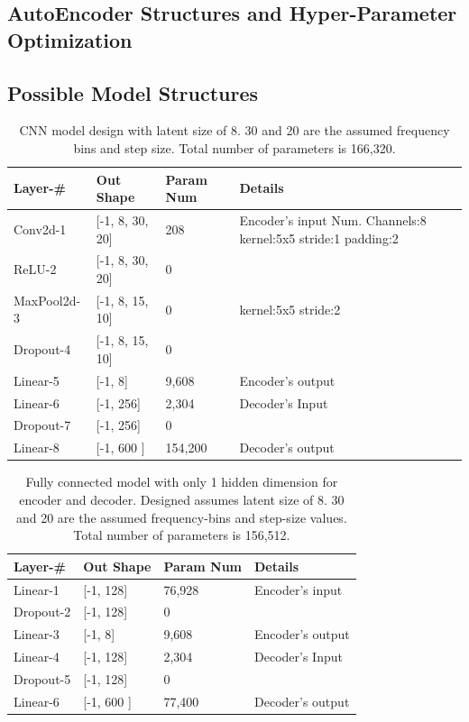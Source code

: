 \documentclass[runningheads,a4paper]{llncs}
\begin{document}
\begin{appendices}
\chapter{AutoEncoder Structures and Hyper-Parameter Optimization}
\label{appendix:D}
\section{Possible Model Structures}
\begin{table}[[h]
\begin{tabular}{|p{28mm}|p{25mm}|p{23mm}|p{50mm}|}
\hline
Layer-\# & Out Shape & Param Num & Details  \\ \hline
Conv2d-1 & [-1, 8, 30, 20] &   208 & Encoder's input \newline
Num. Channels:8\newline
kernel:5x5\newline                  
stride:1\newline    
padding:2 \\ \hline
ReLU-2 & [-1, 8, 30, 20] &   0 & \\  \hline
MaxPool2d-3 & [-1, 8, 15, 10] & 0 &  kernel:5x5 \newline
stride:2 \\ \hline
Dropout-4 & [-1, 8, 15, 10] & 0 &  \\ \hline
Linear-5 & [-1, 8] & 9,608 & Encoder's output \\ \hline
Linear-6 & [-1, 256] & 2,304 & Decoder's Input \\ \hline
Dropout-7 & [-1, 256] & 0 &  \\ \hline
Linear-8 & [-1, 600 ] &  154,200& Decoder's output\\ \hline
\end{tabular}
\caption{CNN model design with latent size of 8. 30 and 20 are the assumed frequency bins and step size. Total number of parameters is 166,320. }
\label{table:CNNAUTOENCODER}
\end{table}

\begin{table}[[h]
\begin{tabular}{|p{28mm}|p{25mm}|p{23mm}|p{50mm}|}
\hline
Layer-\# & Out Shape & Param Num & Details  \\ \hline
Linear-1 & [-1, 128]  & 76,928 & Encoder's input \\ \hline
Dropout-2 & [-1, 128] & 0 &  \\ \hline
Linear-3 & [-1, 8] & 9,608 & Encoder's output \\ \hline
Linear-4 & [-1, 128] & 2,304 & Decoder's Input \\ \hline
Dropout-5 & [-1, 128]  & 0 &  \\ \hline
Linear-6  & [-1, 600 ] &  77,400 &Decoder's output\\ \hline
\end{tabular}
\caption{Fully connected model with only 1 hidden dimension for encoder and decoder. Designed assumes latent size of 8. 30 and 20 are the assumed frequency-bins and step-size values. Total number of parameters is 156,512.}
\label{table:FC1_AUTOENCODER}
\end{table}


\end{appendices}
\end{document}
